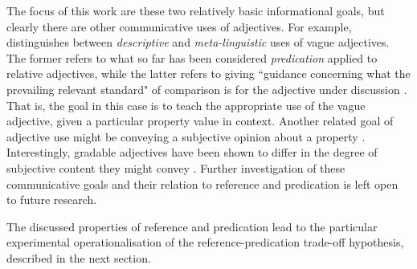 The focus of this work are these two relatively basic informational goals, but clearly there are other communicative uses of adjectives. For example, \textcite{barker2002dynamics} distinguishes between \textit{descriptive} and \textit{meta-linguistic} uses of vague adjectives. The former refers to what so far has been considered \emph{predication} applied to relative adjectives, while the latter refers to giving ``guidance concerning what the prevailing relevant standard" of comparison is for the adjective under discussion \parencite[p. 2]{barker2002dynamics}. That is, the goal in this case is to teach the appropriate use of the vague adjective, given a particular property value in context. Another related goal of adjective use might be conveying a subjective opinion about a property \parencite{kaiser2020}. Interestingly, gradable adjectives have been shown to differ in the degree of subjective content they might convey \parencite{scontras2017subjectivity}. Further investigation of these communicative goals and their relation to reference and predication is left open to future research.

The discussed properties of reference and predication lead to the particular experimental operationalisation of the reference-predication trade-off hypothesis, described in the next section. 

